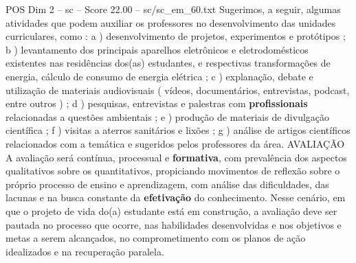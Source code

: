 \begin{textsample}{POS Dim 2 – sc – Score 22.00 – sc/sc\_em\_60.txt}
Sugerimos, a seguir, algumas atividades que podem auxiliar os professores no desenvolvimento das unidades curriculares, como : a ) desenvolvimento de projetos, experimentos e protótipos ; b ) levantamento dos principais aparelhos eletrônicos e eletrodomésticos existentes nas residências dos(as) estudantes, e respectivas transformações de energia, cálculo de consumo de energia elétrica ; c ) explanação, debate e utilização de materiais audiovisuais ( vídeos, documentários, entrevistas, podcast, entre outros ) ; d ) pesquisas, entrevistas e palestras com \textbf{profissionais} relacionadas a questões ambientais ; e ) produção de materiais de divulgação científica ; f ) visitas a aterros sanitários e lixões ; g ) análise de artigos científicos relacionados com a temática e sugeridos pelos professores da área.
AVALIAÇÃO A avaliação será contínua, processual e \textbf{formativa}, com prevalência dos aspectos qualitativos sobre os quantitativos, propiciando movimentos de reflexão sobre o próprio processo de ensino e aprendizagem, com análise das dificuldades, das lacunas e na busca constante da \textbf{efetivação} do conhecimento.
Nesse cenário, em que o projeto de vida do(a) estudante está em construção, a avaliação deve ser pautada no processo que ocorre, nas habilidades desenvolvidas e nos objetivos e metas a serem alcançados, no comprometimento com os planos de ação idealizados e na recuperação paralela.

\end{textsample}
